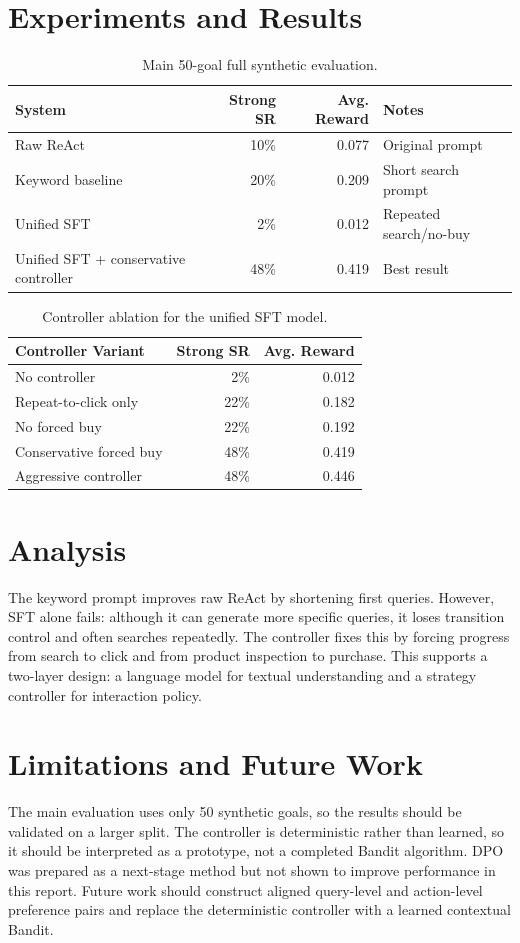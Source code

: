 \documentclass[11pt]{article}
\begin{document}
\section{Experiments and Results}
\begin{table}[h]
\centering
\begin{tabular}{lrrl}
\toprule
System & Strong SR & Avg. Reward & Notes \\
\midrule
Raw ReAct & 10\% & 0.077 & Original prompt \\
Keyword baseline & 20\% & 0.209 & Short search prompt \\
Unified SFT & 2\% & 0.012 & Repeated search/no-buy \\
Unified SFT + conservative controller & 48\% & 0.419 & Best result \\
\bottomrule
\end{tabular}
\caption{Main 50-goal full synthetic evaluation.}
\end{table}

\begin{table}[h]
\centering
\begin{tabular}{lrr}
\toprule
Controller Variant & Strong SR & Avg. Reward \\
\midrule
No controller & 2\% & 0.012 \\
Repeat-to-click only & 22\% & 0.182 \\
No forced buy & 22\% & 0.192 \\
Conservative forced buy & 48\% & 0.419 \\
Aggressive controller & 48\% & 0.446 \\
\bottomrule
\end{tabular}
\caption{Controller ablation for the unified SFT model.}
\end{table}

\section{Analysis}
The keyword prompt improves raw ReAct by shortening first queries. However, SFT alone fails: although it can generate more specific queries, it loses transition control and often searches repeatedly. The controller fixes this by forcing progress from search to click and from product inspection to purchase. This supports a two-layer design: a language model for textual understanding and a strategy controller for interaction policy.

\section{Limitations and Future Work}
The main evaluation uses only 50 synthetic goals, so the results should be validated on a larger split. The controller is deterministic rather than learned, so it should be interpreted as a prototype, not a completed Bandit algorithm. DPO was prepared as a next-stage method but not shown to improve performance in this report. Future work should construct aligned query-level and action-level preference pairs and replace the deterministic controller with a learned contextual Bandit.
\end{document}
